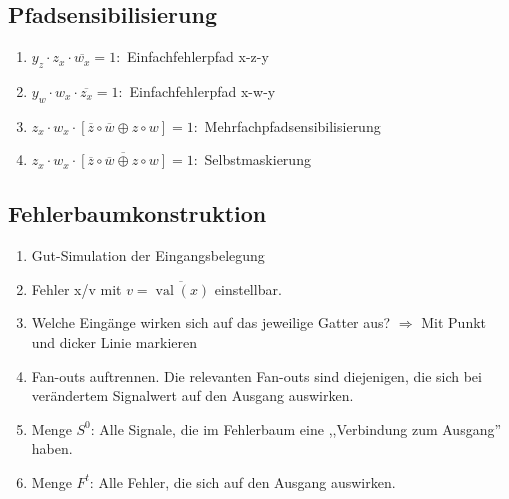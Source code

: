 \documentclass[a4paper,twocolumn,10pt]{article}
\DeclareMathOperator{\val}{val}
\begin{document}
\subsection*{Pfadsensibilisierung}
\begin{enumerate}
	\item $y_z\cdot z_x\cdot \overline{w_x}=1 : $ Einfachfehlerpfad x-z-y
	\item $y_w\cdot w_x\cdot \overline{z_x}=1 : $ Einfachfehlerpfad x-w-y
	\item $z_x\cdot w_x\cdot\left[\overline{z}\circ\overline{w}\oplus z\circ w\right]=1 : $ Mehrfachpfadsensibilisierung
	\item $z_x\cdot w_x\cdot\overline{\left[\overline{z}\circ\overline{w}\oplus z\circ w\right]}=1 : $ Selbstmaskierung
\end{enumerate}

\subsection*{Fehlerbaumkonstruktion}
\begin{enumerate}
	\item Gut-Simulation der Eingangsbelegung
	\item Fehler x/v mit $v=\overline{\val(x)}$ einstellbar.
	\item Welche Eingänge wirken sich auf das jeweilige Gatter aus?
		$\Rightarrow$ Mit Punkt und dicker Linie markieren
	\item Fan-outs auftrennen. Die relevanten Fan-outs sind diejenigen, die sich bei verändertem Signalwert auf den Ausgang auswirken.
	\item Menge $S^0$: Alle Signale, die im Fehlerbaum eine ,,Verbindung zum Ausgang'' haben.
	\item Menge $F^t$: Alle Fehler, die sich auf den Ausgang auswirken.
\end{enumerate}
\end{document}
